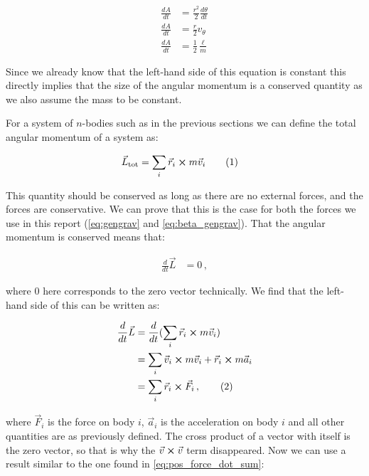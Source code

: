 \documentclass[reprint,english,notitlepage]{revtex4-1}  %
\newcommand\numberthis{\addtocounter{equation}{1}\tag{\theequation}}
\begin{document}
\begin{align*}
\frac{dA}{dt} &= \frac{r^2}{2} \frac{d\theta}{dt} \\
\frac{dA}{dt} &= \frac{r}{2} v_\theta \\
\frac{dA}{dt} &= \frac{1}{2} \frac{\ell}{m}
\end{align*}

Since we already know that the left-hand side of this equation is constant this directly implies that the size of the angular momentum is a conserved quantity as we also assume the mass to be constant.

For a system of $n$-bodies such as in the previous sections we can define the total angular momentum of a system as:

\begin{align*}
\vec{L}_\text{tot} &= \sum\limits_i \vec{r}_i \cross m\vec{v}_i \numberthis \label{eq:tot_ang_mom}
\end{align*}

This quantity should be conserved as long as there are no external forces, and the forces are conservative. We can prove that this is the case for both the forces we use in this report (\eqref{eq:gengrav} and \eqref{eq:beta_gengrav}). That the angular momentum is conserved means that:

\begin{align*}
\frac{d}{dt} \vec{L} &= 0 \, ,
\end{align*}

where 0 here corresponds to the zero vector technically. We find that the left-hand side of this can be written as:

\begin{align*}
\frac{d}{dt} \vec{L} &= \frac{d}{dt} (\sum\limits_i \vec{r}_i \cross m \vec{v}_i)  \\
&= \sum\limits_i \vec{v}_i \cross m \vec{v}_i + \vec{r}_i \cross m \vec{a}_i \\
&= \sum\limits_i \vec{r}_i \cross \vec{F}_i  \, , \numberthis \label{eq:interm_ang_mom_cons}
\end{align*}

where $\vec{F}_i$ is the force on body $i$, $\vec{a}_i$ is the acceleration on body $i$ and all other quantities are as previously defined. The cross product of a vector with itself is the zero vector, so that is why the $\vec{v} \cross \vec{v}$ term disappeared. Now we can use a result similar to the one found in \eqref{eq:pos_force_dot_sum}:
\end{document}
